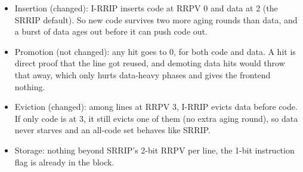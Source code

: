 \documentclass[10pt]{article}
\providecommand{\tightlist}{%
  \setlength{\itemsep}{2pt}\setlength{\parskip}{0pt}}
\begin{document}
\begin{itemize}
\tightlist
\item Insertion (changed): I-RRIP inserts code at RRPV 0 and data at 2 (the SRRIP default). So new code survives two more aging rounds than data, and a burst of data ages out before it can push code out.
\item Promotion (not changed): any hit goes to 0, for both code and data. A hit is direct proof that the line got reused, and demoting data hits would throw that away, which only hurts data-heavy phases and gives the frontend nothing.
\item Eviction (changed): among lines at RRPV 3, I-RRIP evicts data before code. If only code is at 3, it still evicts one of them (no extra aging round), so data never starves and an all-code set behaves like SRRIP.
\item Storage: nothing beyond SRRIP's 2-bit RRPV per line, the 1-bit instruction flag is already in the block.
\end{itemize}
\end{document}

